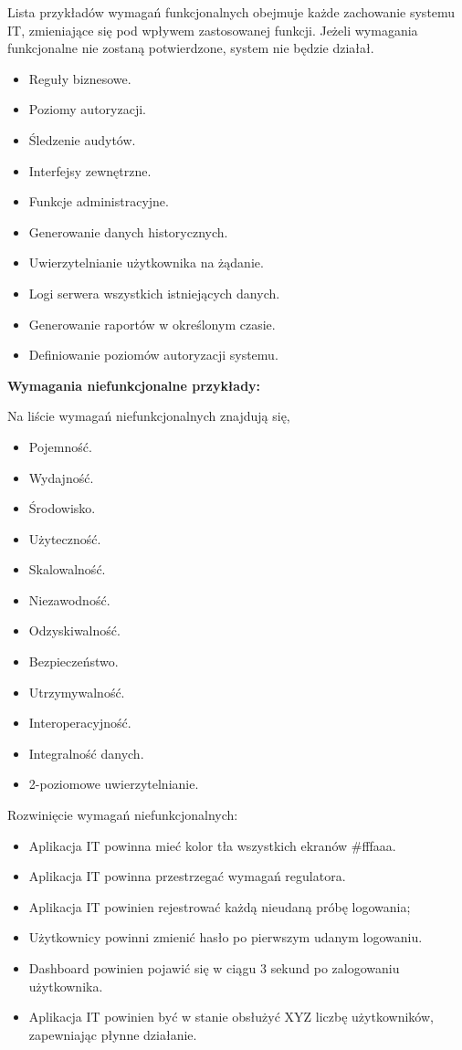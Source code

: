 Lista przykładów wymagań funkcjonalnych obejmuje każde zachowanie systemu IT, zmieniające się pod wpływem zastosowanej funkcji. Jeżeli wymagania funkcjonalne nie zostaną potwierdzone, system nie będzie działał.
\begin{itemize}
    \item Reguły biznesowe.
    \item Poziomy autoryzacji.
    \item  Śledzenie audytów.
    \item Interfejsy zewnętrzne.
    \item Funkcje administracyjne.
    \item Generowanie danych historycznych.
    \item Uwierzytelnianie użytkownika na żądanie.
    \item Logi serwera wszystkich istniejących danych.
    \item Generowanie raportów w określonym czasie.
    \item Definiowanie poziomów autoryzacji systemu.
\end{itemize}

\noindent \textbf{Wymagania niefunkcjonalne przykłady:}

\noindent Na liście wymagań niefunkcjonalnych znajdują się,
\begin{itemize}
    \item Pojemność.
    \item Wydajność.
    \item Środowisko.
    \item Użyteczność.
    \item Skalowalność.
    \item Niezawodność.
    \item Odzyskiwalność.
    \item Bezpieczeństwo.
    \item Utrzymywalność.
    \item Interoperacyjność.
    \item Integralność danych.
    \item  2-poziomowe uwierzytelnianie.
\end{itemize}

\noindent Rozwinięcie wymagań niefunkcjonalnych:
\begin{itemize}
    \item Aplikacja IT powinna mieć kolor tła wszystkich ekranów \#fffaaa.
    \item Aplikacja IT powinna przestrzegać wymagań regulatora.
    \item Aplikacja IT powinien rejestrować każdą nieudaną próbę logowania;
    \item Użytkownicy powinni zmienić hasło po pierwszym udanym logowaniu.
    \item  Dashboard powinien pojawić się w ciągu 3 sekund po zalogowaniu użytkownika.
    \item Aplikacja IT powinien być w stanie obsłużyć XYZ liczbę użytkowników, zapewniając płynne działanie.
\end{itemize}

